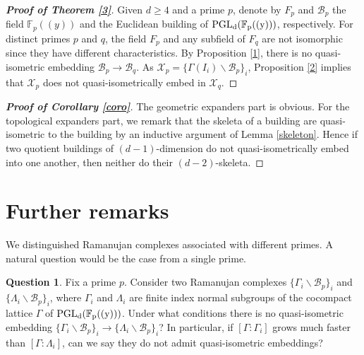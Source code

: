 \documentclass[letterpaper, reqno, 11pt]{amsart}
\theoremstyle{definition}
\theoremstyle{definition}
\newtheorem{question}[theorem]{Question}
\theoremstyle{remark}
\begin{document}
\begin{proof} [\textbf{Proof of Theorem \ref{3}}]
    Given $d \geq 4$ and a prime $p$, denote by $F_p$ and $\mathcal{B}_p$ the field $\mathbb{F}_p((y))$ and the Euclidean building of $\rm{PGL}_d(\mathbb{F}_p((y)))$, respectively. 
    For distinct primes $p$ and $q$, the field $F_p$ and any subfield of $F_q$ are not isomorphic since they have different characteristics. 
    By Proposition \ref{1}, there is no quasi-isometric embedding $\mathcal{B}_p \to \mathcal{B}_q$. 
    As $\mathscr{X}_p= \{\Gamma(I_i)\backslash \mathcal{B}_p\}_i$, Proposition \ref{2} implies that $\mathscr{X}_p$ does not quasi-isometrically embed in $\mathscr{X}_q$. 
\end{proof}

\begin{proof} [\textbf{Proof of Corollary \ref{coro}}]
    The geometric expanders part is obvious. For the topological expanders part, we remark that the skeleta of a building are quasi-isometric to the building by an inductive argument of Lemma \ref{skeleton}. 
    Hence if two quotient buildings of $(d-1)$-dimension do not quasi-isometrically embed into one another, then neither do their $(d-2)$-skeleta.
\end{proof}









\section{Further remarks}\label{5}


We distinguished Ramanujan complexes associated with different primes. A natural question would be the case from a single prime.

\begin{question}
Fix a prime $p$.
Consider two Ramanujan complexes 
$\{\Gamma_i \backslash \mathcal{B}_p\}_i$ and 
$\{\Lambda_i \backslash \mathcal{B}_p\}_i$, 
where $\Gamma_i$ and $\Lambda_i$ are finite index normal subgroups of the cocompact lattice $\Gamma$ of $\rm{PGL}_d(\mathbb{F}_p ((y)))$.
Under what conditions there is no
quasi-isometric embedding $\{\Gamma_i \backslash \mathcal{B}_p\}_i \to \{\Lambda_i \backslash \mathcal{B}_p\}_i$?
In particular, if $[\Gamma : \Gamma_i]$ grows much faster than $[\Gamma : \Lambda_i]$, can we say 
they do not admit quasi-isometric embeddings?
\end{question}
\end{document}
